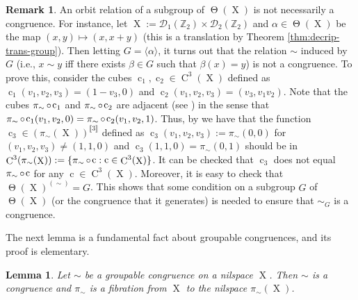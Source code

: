 \documentclass[a4paper,12pt,reqno]{amsart}
\newtheorem{lemma}[theorem]{Lemma}
\theoremstyle{definition}
\newtheorem{remark}[theorem]{Remark}
\newcommand*{\db}[1]{\llbracket #1\rrbracket}
\newcommand{\mc}{\mathcal}
\newcommand{\mb}{\mathbb}
\DeclareMathOperator{\tran}{\Theta}
\DeclareMathOperator{\q}{c}
\DeclareMathOperator{\ns}{X}
\DeclareMathOperator{\co}{\circ\hspace{-0.02 cm}}
\DeclareMathOperator{\cu}{C}
\begin{document}
\begin{remark}\label{rem:noncongorbit}
An orbit relation of a subgroup of $\tran(\ns)$ is not necessarily a congruence. For instance, let $\ns:=\mc{D}_1(\mb{Z}_2)\times \mc{D}_2(\mb{Z}_2)$ and $\alpha\in \tran(\ns)$ be the map $(x,y)\mapsto (x,x+y)$ (this is a translation by Theorem \ref{thm:decrip-trans-group}). Then letting $G=\langle \alpha \rangle$, it turns out that the relation  $\sim$ induced by $G$ (i.e., $x\sim y$ iff there exists $\beta\in G$ such that $\beta(x)=y$) is not a congruence. To prove this, consider the cubes $\q_1,\q_2\in \cu^3(\ns)$ defined as $\q_1(v_1,v_2,v_3)=(1-v_3,0)$ and $\q_2(v_1,v_2,v_3)= (v_3,v_1v_2)$. Note that the cubes $\pi_\sim \co \q_1 $ and $\pi_\sim \co \q_2$ are adjacent (see \cite[Definition 3.1.6]{Cand:Notes1}) in the sense that $\pi_\sim \co \q_1(v_1,v_2,0)= \pi_\sim \co \q_2(v_1,v_2,1)$. Thus, by \cite[Lemma 3.1.7]{Cand:Notes1} we have that the function $\q_3\in (\pi_\sim(\ns))^{\db{3}}$ defined as $\q_3(v_1,v_2,v_3):=\pi_\sim(0,0)$ for $(v_1,v_2,v_3)\not=(1,1,0)$ and $\q_3(1,1,0)=\pi_\sim(0,1)$ should be in $\cu^3(\pi_\sim(\ns)):=\{\pi_\sim \co \q:\q\in \cu^3(\ns)\}$. It can be checked that $\q_3$ does not equal $\pi_\sim\co \q$ for any $\q\in \cu^3(\ns)$. Moreover, it is easy to check that $\tran(\ns)^{(\sim)} = G$. This shows that some condition on a subgroup $G$ of $\tran(\ns)$ (or the congruence that it generates) is needed to ensure that $\sim_G$ is a congruence.
\end{remark}

\noindent The next lemma is a fundamental fact about groupable congruences, and its proof is elementary. 

\begin{lemma}\label{lem:gpequivcong}
Let $\sim$ be a groupable congruence on a nilspace $\ns$. Then $\sim$ is a congruence and $\pi_{\sim}$ is a fibration from $\ns$ to the nilspace $\pi_{\sim}(\ns)$.
\end{lemma}
\end{document}
